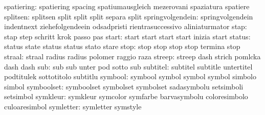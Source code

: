                spatiering: spatiering                spacing
                           spatiumausgleich          mezerovani
                           spaziatura                spatiere
                 splitsen: splitsen                  split
                           split                     split
                           separa                    split %
         springvolgendein: springvolgendein          indentnext
                           ziehefolgendeein          odsadpristi
                           rientrasuccessivo         aliniaturmator
                     stap: stap                      step
                           schritt                   krok
                           passo                     pas
                    start: start                     start
                           start                     start
                           inizia                    start
                   status: status                    state
                           status                    status
                           stato                     stare
                     stop: stop                      stop
                           stop                      stop
                           termina                   stop
                   straal: straal                    radius
                           radius                    polomer
                           raggio                    raza
                   streep: streep                    dash
                           strich                    pomlcka
                           dash                      dash %
                      sub: sub                       sub
                           unter                     pod
                           sotto                     sub
                 subtitel: subtitel                  subtitle
                           untertitel                podtitulek
                           sottotitolo               subtitlu
                  symbool: symbool                   symbol
                           symbol                    symbol
                           simbolo                   simbol
               symboolset: symboolset                symbolset
                           symbolset                 sadasymbolu
                           setsimboli                setsimbol
                 symkleur: symkleur                  symcolor
                           symfarbe                  barvasymbolu
                           coloresimbolo             culoaresimbol
                symletter: symletter                 symstyle
